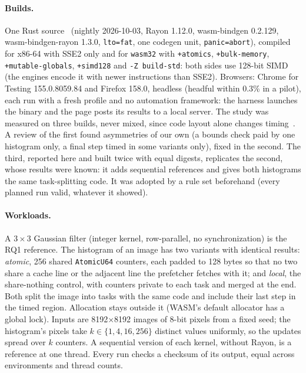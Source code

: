 \documentclass[sigplan]{acmart}
\begin{document}
\paragraph{Builds.} One Rust source~\cite{repo} (nightly 2026-10-03, Rayon
1.12.0, wasm-bindgen 0.2.129, wasm-bindgen-rayon 1.3.0, \texttt{lto=fat},
one codegen unit, \texttt{panic=abort}), compiled for x86-64 with SSE2 only
and for \texttt{wasm32} with \texttt{+atomics}, \texttt{+bulk-memory},
\texttt{+mutable-globals}, \texttt{+simd128} and \texttt{-Z build-std}:
both sides use 128-bit SIMD (the engines encode it with newer instructions
than SSE2). Browsers: Chrome for Testing 155.0.8059.84 and Firefox 158.0,
headless (headful within 0.3\% in a pilot), each run with a fresh profile
and no automation framework: the harness launches the binary and the page
posts its results to a local server. The study was measured on three
builds, never mixed, since code layout alone changes
timing~\cite{mytkowicz2009}. A review of the first found asymmetries of our
own (a bounds check paid by one histogram only, a final step timed in some
variants only), fixed in the second. The third, reported here and built
twice with equal digests, replicates the second, whose results were known:
it adds sequential references and gives both histograms the same
task-splitting code. It was adopted by a rule set beforehand (every planned
run valid, whatever it showed).

\paragraph{Workloads.} A $3\times3$ Gaussian filter (integer kernel,
row-parallel, no synchronization) is the RQ1 reference. The histogram of an
image has two variants with identical results: \emph{atomic}, 256 shared
\texttt{AtomicU64} counters, each padded to 128 bytes so that no two share
a cache line or the adjacent line the prefetcher fetches with it; and
\emph{local}, the share-nothing control, with counters private to each task
and merged at the end. Both split the image into tasks with the same code
and include their last step in the timed region. Allocation stays outside
it (WASM's default allocator has a global lock). Inputs are
8192$\times$8192 images of 8-bit pixels from a fixed seed; the histogram's
pixels take $k \in \{1,4,16,256\}$ distinct values uniformly, so the
updates spread over $k$ counters. A sequential version of each kernel,
without Rayon, is a reference at one thread. Every run checks a checksum of
its output, equal across environments and thread counts.
\end{document}
